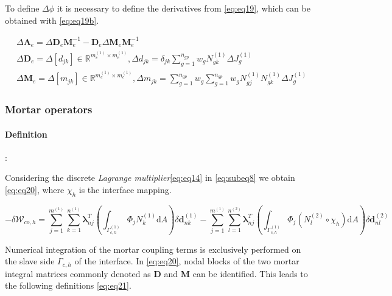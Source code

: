 \documentclass[a4paper,10pt]{article} %
\begin{document}
To define $\Delta \phi$ it is necessary to define the derivatives from \eqref{eq:eq19}, which can be obtained with \eqref{eq:eq19b}.

\begin{equation}\label{eq:eq19b}
    \begin{aligned}
        & \Delta \mathbf{A}_e = \Delta \mathbf{D}_e\mathbf{M}_e^{-1} - \mathbf{D}_e\Delta\mathbf{M}_e\mathbf{M}_e^{-1} \\
        & \Delta \mathbf{D}_e = \Delta[d_{jk}] \in \mathbb{R}^{m_e^{(1)} \times m_e^{(1)}}, \Delta d_{jk} = \delta_{jk} \sum_{g = 1}^{n_{gp}} w_g N_{gk}^{(1)} \Delta J_g^{(1)}  \\
        & \Delta \mathbf{M}_e = \Delta[m_{jk}] \in \mathbb{R}^{m_e^{(1)} \times m_e^{(1)}}, \Delta m_{jk} = \sum_{g = 1}^{n_{gp}} w_g  \sum_{g = 1}^{n_{gp}} w_g  N_{gj}^{(1)} N_{gk}^{(1)} \Delta J_g^{(1)}
    \end{aligned}
\end{equation}
 
\subsubsection{Mortar operators}

\paragraph{Definition}:

Considering the discrete \textit{Lagrange multiplier}\eqref{eq:eq14} in \eqref{eq:subeq8} we obtain \eqref{eq:eq20}, where $\chi_h$ is the interface mapping.

\begin{equation}\label{eq:eq20}
    -\delta \mathcal{W}_{co,h} = \sum_{j=1}^{m^{(1)}}\sum_{k=1}^{n^{(1)}} \boldsymbol{\lambda}_{nj}^T \left(\int_{\Gamma_{c,h}^{(1)}} \Phi_j N_k^{(1)} \text{d}A \right) \delta \mathbf{d}_{nk}^{(1)} -\sum_{j=1}^{m^{(1)}}\sum_{l=1}^{n^{(2)}} \boldsymbol{\lambda}_{nj}^T \left(\int_{\Gamma_{c,h}^{(1)}} \Phi_j \left(N_l^{(2)} \circ \chi_h\right) \text{d}A \right) \delta \mathbf{d}_{nl}^{(2)}
\end{equation}

Numerical integration of the mortar coupling terms is exclusively performed on the slave side $\Gamma_{c,h}$ of the interface. In \eqref{eq:eq20}, nodal blocks of the two mortar integral matrices commonly denoted as $\mathbf{D}$ and $\mathbf{M}$ can be identified. This leads to the following definitions \eqref{eq:eq21}.
\end{document}

